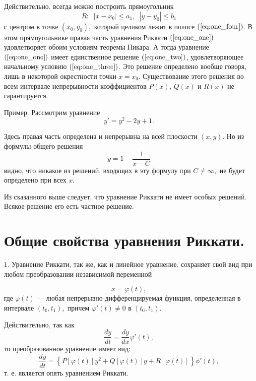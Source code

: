 Действительно, всегда можно построить прямоугольник
$$ R: \; \; \left| x - x_{0} \right| \leqslant a_{1}, \; \; \left| y - y_{0} \right| \leqslant b_{1}$$
с центром в точке $\left( x_{0}, y_{0} \right),$ который целиком лежит в полосе $\left( \ref{eq:one_four} \right)$. В этом прямоугольнике правая часть уравнения Риккати $\left( \ref{eq:one_one} \right)$ удовлетворяет обоим условиям теоремы Пикара. А тогда уравнение $\left( \ref{eq:one_one} \right)$ имеет единственное решение $\left( \ref{eq:one_two} \right)$, удовлетворяющее начальному условию $\left( \ref{eq:one_three} \right)$. Это решение определено вообще говоря, лишь в некоторой окрестности точки $x = x_{0}.$ Существование этого решения во всем интервале непрерывности коэффициентов $P \left( x \right)$, $Q \left( x \right)$ и $R \left( x \right)$ не гарантируется.

Пример. Рассмотрим уравнение
$$y' = y^{2} - 2 y + 1.$$

Здесь правая часть определена и непрерывна на всей плоскости $\left( x, y \right)$. Но из формулы общего решения
$$y = 1 - \dfrac{1}{x - C}$$
видно, что никакое из решений, входящих в эту формулу при $C \neq \infty,$ не будет определено при всех $x$.

Из сказанного выше следует, что уравнение Риккати не имеет особых решений. Всякое решение его есть частное решение.

\section{Общие свойства уравнения Риккати.}%
$1.$ Уравнение Риккати, так же, как и линейное уравнение, сохраняет свой вид при любом преобразовании независимой переменной

\begin{equation}  \label{eq:one_five}
    x = \varphi \left( t \right),
\end{equation}
где $\varphi \left( t \right)$ --- любая непрерывно-дифференцируемая функция, определенная в интервале $\left( t_{0}, t_{1} \right),$ причем $\varphi' \left( t \right) \neq 0$ в $\left( t_{0}, t_{1} \right).$

Действительно, так как 
$$\dfrac{dy}{dt} = \dfrac{dy}{dx} \varphi'\left( t \right),$$
то преобразованное уравнение имеет вид:
$$\dfrac{dy}{dt} = \left\{ P \left[\varphi\left( t \right) \right] y^{2} + Q \left[\varphi\left( t \right) \right] y + R\left[\varphi\left( t \right) \right] \right\} \phi' \left( t \right),$$
т. е. является опять уравнением Риккати.

